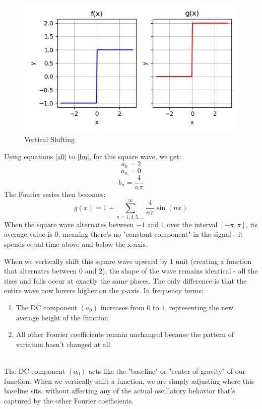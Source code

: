 \documentclass{article}
\begin{document}
\begin{figure}
        \centering
        \includegraphics[width=\textwidth]{vertical_shift.jpg}
        \caption{Vertical Shifting}
        \label{vertical shifting}
    \end{figure}
    
Using equations \ref{a0} to \ref{bn}, for this square wave, we get:
    \begin{equation}
    a_0 = 2
    \end{equation}
    \begin{equation}
    a_n = 0
    \end{equation}
    \begin{equation}
    b_n = \frac{4}{n\pi}
    \end{equation}
The Fourier series then becomes:
    \begin{equation}
g(x) = 1 + \sum_{n=1,3,5,...}^{\infty} \frac{4}{n\pi} \sin\left(nx\right)
    \end{equation}
When the square wave alternates between $-1$ and $1$ over the interval $[-\pi, \pi]$, its average value is $0$, meaning there's no "constant component" in the signal - it spends equal time above and below the x-axis.

When we vertically shift this square wave upward by $1$ unit (creating a function that alternates between $0$ and $2$), the shape of the wave remains identical - all the rises and falls occur at exactly the same places. The only difference is that the entire wave now hovers higher on the y-axis. In frequency terms:

\begin{enumerate}
\item The DC component $(a_0)$ increases from $0$ to $1$, representing the new average height of the function
\item All other Fourier coefficients remain unchanged because the pattern of variation hasn't changed at all

\end{enumerate}\\
The DC component $(a_0)$ acts like the "baseline" or "center of gravity" of our function. When we vertically shift a function, we are simply adjusting where this baseline sits, without affecting any of the actual oscillatory behavior that's captured by the other Fourier coefficients.
\end{document}
